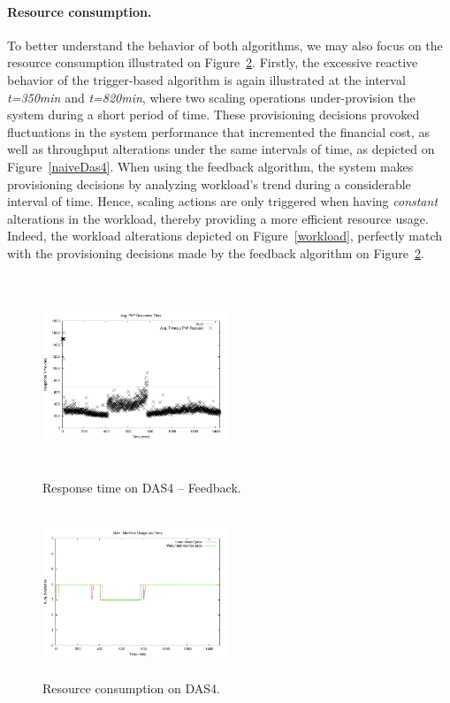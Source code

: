 \paragraph{Resource consumption.}

To better understand the behavior of both algorithms, we may also focus on the resource consumption illustrated on Figure~\ref{resComDas4}. Firstly, the excessive reactive behavior of the trigger-based algorithm is again illustrated at the interval \emph{t=350min} and \emph{t=820min}, where two scaling operations under-provision the system during a short period of time. These provisioning decisions provoked fluctuations in the system performance that incremented the financial cost, as well as throughput alterations under the same intervals of time, as depicted on Figure~\ref{naiveDas4}. When using the feedback algorithm, the system makes provisioning decisions by analyzing workload's trend during a considerable interval of time. Hence, scaling actions are only triggered when having \emph{constant} alterations in the workload, thereby providing a more efficient resource usage. Indeed, the workload alterations depicted on Figure~\ref{workload}, perfectly match with the provisioning decisions made by the feedback algorithm on Figure~\ref{resComDas4}.

\begin{figure}
\begin{center}
\includegraphics[width=0.49\textwidth, height=6cm]{./images/homogeneous/avgTimeout_PhP_feedback}
\end{center}
\vspace{-5mm}
\caption{Response time on DAS4 -- Feedback.}
\label{historyDas4}
\end{figure}

\begin{figure}
\begin{center}
\includegraphics[width=0.49\textwidth, height=5cm]{./images/homogeneous/numMachinesComp}
\end{center}
\vspace{-5mm}
\caption{Resource consumption on DAS4.}
\label{resComDas4}
\end{figure}

